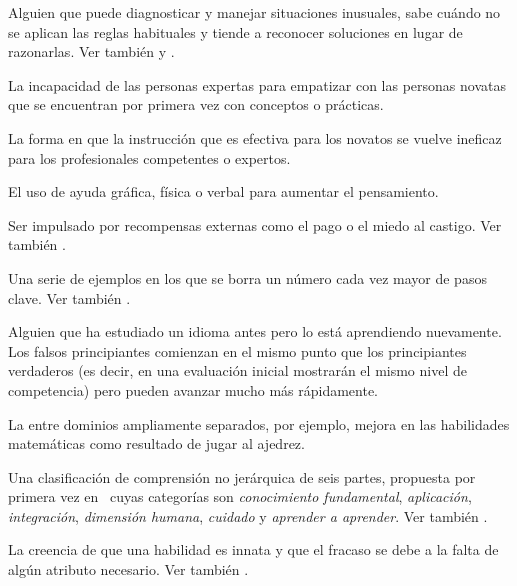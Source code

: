 \begin{description}
 Alguien que puede diagnosticar y manejar situaciones inusuales, 
sabe cuándo no se aplican las reglas habituales y tiende a reconocer soluciones en lugar de razonarlas. 
Ver también 
y .

 La incapacidad de las personas expertas 
para empatizar con las personas novatas que se encuentran por primera 
vez con conceptos o prácticas.

 La forma en que 
la instrucción que es efectiva para los novatos se vuelve ineficaz para 
los profesionales competentes o expertos.

 El uso de ayuda gráfica, 
física o verbal para aumentar el pensamiento.


 Ser impulsado por 
recompensas externas como el pago o el miedo al castigo. Ver
también .

 Una serie de ejemplos en los que 
se borra un número cada vez mayor de pasos clave. Ver
también .

 Alguien que ha estudiado un idioma antes pero lo está aprendiendo nuevamente. Los falsos principiantes comienzan en el mismo punto que los principiantes verdaderos (es decir, en una evaluación inicial mostrarán el mismo nivel de competencia) pero pueden avanzar mucho más rápidamente.


 La  entre dominios ampliamente separados, por ejemplo, mejora en las habilidades matemáticas como resultado de jugar al ajedrez.

 Una clasificación de comprensión no jerárquica 
de seis partes, propuesta por primera vez en~\cite{Fink2013} cuyas categorías son \emph{conocimiento fundamental}, \emph{aplicación}, \emph{integración}, \emph{dimensión humana}, \emph{cuidado} y 
\emph{aprender a aprender}. Ver también .

 La creencia de que una habilidad es innata y que 
el fracaso se debe a la falta de algún atributo necesario. Ver también
.



\end{description}

